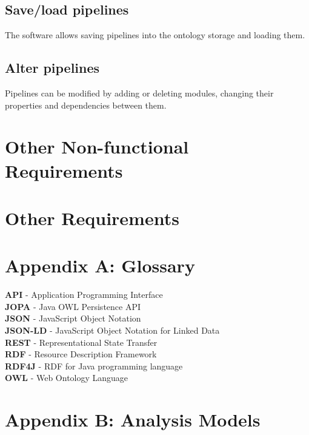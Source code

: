 \documentclass{article}
\begin{document}
\subsection{Save/load pipelines}
The software allows saving pipelines into the ontology storage and loading them.
\subsection{Alter pipelines}
Pipelines can be modified by adding or deleting modules, changing their properties and dependencies between them.
\section{Other Non-functional Requirements}
\section{Other Requirements}
\section*{Appendix A: Glossary}
\textbf{API} - Application Programming Interface\\
\textbf{JOPA} - Java OWL Persistence API\\
\textbf{JSON} - JavaScript Object Notation\\
\textbf{JSON-LD} - JavaScript Object Notation for Linked Data\\
\textbf{REST} - Representational State Transfer\\
\textbf{RDF} - Resource Description Framework\\
\textbf{RDF4J} - RDF for Java programming language\\
\textbf{OWL} - Web Ontology Language
\section*{Appendix B: Analysis Models}
\end{document}
